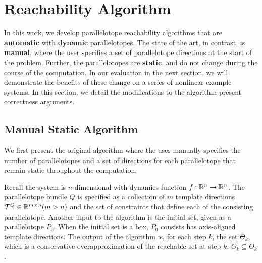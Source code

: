 \section{Reachability Algorithm}
\label{sec:theory}

In this work, we develop parallelotope reachability algorithms that are \textbf{automatic} with \textbf{dynamic} parallelotopes.
%
The state of the art, in contrast, is \textbf{manual}, where the user specifies a set of parallelotope directions at the start of the problem.
%
Further, the parallelotopes are \textbf{static}, and do not change during the course of the computation.
%
In our evaluation in the next section, we will demonstrate the benefits of these change on a series of nonlinear example systems.
%
In this section, we detail the modifications to the algorithm present correctness arguments.

\subsection{Manual Static Algorithm}
\label{sec:manualstatic}

We first present the original algorithm where the user manually specifies the number of parallelotopes and a set of directions for each parallelotope that remain static throughout the computation.

Recall the system is $n$-dimensional with dynamics function $f: \reals^{n} \rightarrow \reals^{n}$.
%
The parallelotope bundle $Q$ is specified as a collection of $m$ template directions $\T^{Q} \in \reals^{m \times n} (m > n)$ and the set of constraints that define each of the consisting parallelotope.
%
%
%
Another input to the algorithm is the initial set, given as a parallelotope $P_0$.
%
When the initial set is a box, $P_0$ consists has axis-aligned template directions.
%
The output of the algorithm is, for each step $k$, the set $\overline\Theta_k$, which is a conservative overapproximation of the reachable set at step $k$, $\Theta_k \subseteq \overline\Theta_k$.

